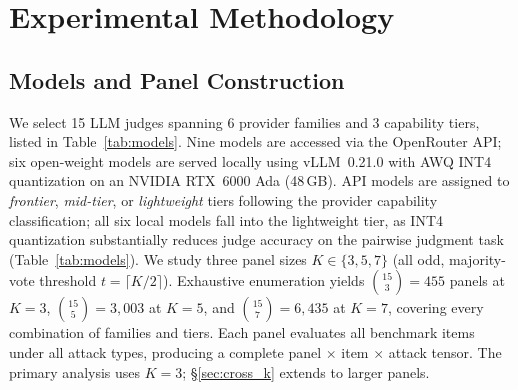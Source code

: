 \section{Experimental Methodology}
\label{sec:experiments}

\subsection{Models and Panel Construction}

We select 15 LLM judges spanning 6 provider families and 3 capability tiers, listed in Table~\ref{tab:models}. Nine models are accessed via the OpenRouter API; six open-weight models are served locally using vLLM~0.21.0 with AWQ INT4 quantization on an NVIDIA RTX~6000 Ada (48\,GB). API models are assigned to \emph{frontier}, \emph{mid-tier}, or \emph{lightweight} tiers following the provider capability classification; all six local models fall into the lightweight tier, as INT4 quantization substantially reduces judge accuracy on the pairwise judgment task (Table~\ref{tab:models}). We study three panel sizes $K \in \{3, 5, 7\}$ (all odd, majority-vote threshold $t = \lceil K/2 \rceil$). Exhaustive enumeration yields $\binom{15}{3} = 455$ panels at $K{=}3$, $\binom{15}{5} = 3{,}003$ at $K{=}5$, and $\binom{15}{7} = 6{,}435$ at $K{=}7$, covering every combination of families and tiers. Each panel evaluates all benchmark items under all attack types, producing a complete panel $\times$ item $\times$ attack tensor. The primary analysis uses $K{=}3$; \S\ref{sec:cross_k} extends to larger panels.

